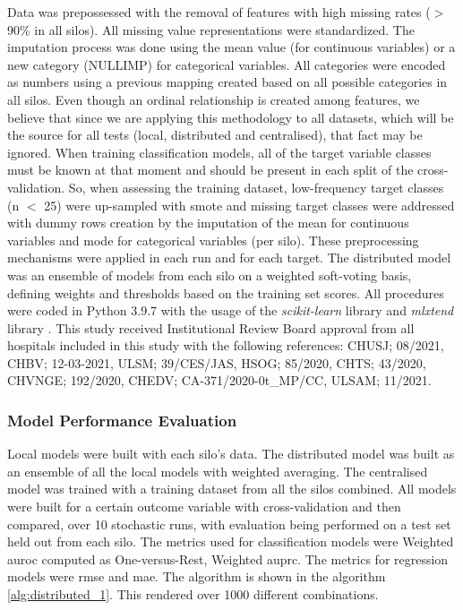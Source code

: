 
Data was prepossessed with the removal of features with high missing rates ($>$ 90\% in all silos). All missing value representations were standardized. The imputation process was done using the mean value (for continuous variables) or a new category (NULLIMP) for categorical variables. All categories were encoded as numbers using a previous mapping created based on all possible categories in all silos. Even though an ordinal relationship is created among features, we believe that since we are applying this methodology to all datasets, which will be the source for all tests (local, distributed and centralised), that fact may be ignored.
When training classification models, all of the target variable classes must be known at that moment and should be present in each split of the cross-validation. So, when assessing the training dataset, low-frequency target classes (n $<$ 25) were up-sampled with \ac{smote} \cite{smote} and missing target classes were addressed with dummy rows creation by the imputation of the mean for continuous variables and mode for categorical variables (per silo). These preprocessing mechanisms were applied in each run and for each target.
The distributed model was an ensemble of models from each silo on a weighted soft-voting basis, defining weights and thresholds based on the training set scores. 
All procedures were coded in Python 3.9.7 with the usage of the \textit{scikit-learn} library \cite{scikit-learn} and \textit{mlxtend} library \cite{mlxtend}.
This study received Institutional Review Board approval from all hospitals included in this study with the following references: CHUSJ; 08/2021, CHBV; 12-03-2021, ULSM; 39/CES/JAS, HSOG; 85/2020, CHTS; 43/2020, CHVNGE; 192/2020,
CHEDV; CA-371/2020-0t\_MP/CC, ULSAM; 11/2021.


\subsubsection{Model Performance Evaluation}

Local models were built with each silo's data. The distributed model was built as an ensemble of all the local models with weighted averaging. The centralised model was trained with a training dataset from all the silos combined. 
All models were built for a certain outcome variable with cross-validation and then compared, over 10 stochastic runs, with evaluation being performed on a test set held out from each silo. The metrics used for classification models were Weighted \ac{auroc} computed as One-versus-Rest, Weighted \ac{auprc}. The metrics for regression models were \ac{rmse} and \ac{mae}. The algorithm is shown in the algorithm \ref{alg:distributed_1}. This rendered over 1000 different combinations.


